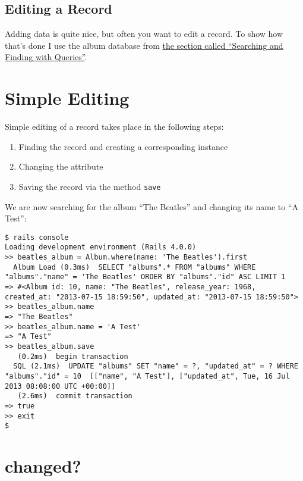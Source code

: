 \documentclass[a4paper]{book}
\newcounter{tab}[chapter]
\begin{document}
\subsection{Editing a Record}\label{editing-a-record}

Adding data is quite nice, but often you want to edit a record. To show how that's done I use the album database from \hyperref[queries]{the section called “Searching and Finding with Queries”}.

\section{Simple Editing}\label{simple-editing}

Simple editing of a record takes place in the following steps:

\begin{enumerate}
\def\labelenumi{\arabic{enumi}.}
\itemsep1pt\parskip0pt
\item
  Finding the record and creating a corresponding instance
\item
  Changing the attribute
\item
  Saving the record via the method \texttt{save}
\end{enumerate}

We are now searching for the album “The Beatles” and changing its name to “A Test”:

\begin{shaded}\begin{verbatim}
$ rails console
Loading development environment (Rails 4.0.0)
>> beatles_album = Album.where(name: 'The Beatles').first
  Album Load (0.3ms)  SELECT "albums".* FROM "albums" WHERE "albums"."name" = 'The Beatles' ORDER BY "albums"."id" ASC LIMIT 1
=> #<Album id: 10, name: "The Beatles", release_year: 1968, created_at: "2013-07-15 18:59:50", updated_at: "2013-07-15 18:59:50">
>> beatles_album.name
=> "The Beatles"
>> beatles_album.name = 'A Test'
=> "A Test"
>> beatles_album.save
   (0.2ms)  begin transaction
  SQL (2.1ms)  UPDATE "albums" SET "name" = ?, "updated_at" = ? WHERE "albums"."id" = 10  [["name", "A Test"], ["updated_at", Tue, 16 Jul 2013 08:08:00 UTC +00:00]]
   (2.6ms)  commit transaction
=> true
>> exit
$
\end{verbatim}\end{shaded}

\section{changed?}\label{changed}
\end{document}
